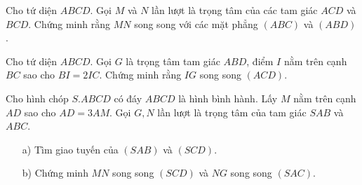 
\begin{vd}
Cho tứ diện $ABCD$. Gọi $M$ và $N$ lần lượt là trọng tâm của các tam giác $ACD$ và $BCD$. Chứng minh rằng $MN$ song song với các mặt phẳng $(ABC)$ và $(ABD)$.
\end{vd}
\begin{vd}
	Cho tứ diện $ABCD$. Gọi $G$ là trọng tâm tam giác $ABD$, điểm $I$ nằm trên cạnh $BC$ sao cho $BI=2IC$. Chứng minh rằng $IG$ song song $\left(ACD\right)$.
\end{vd}
\begin{vd}
	Cho hình chóp $S{.}ABCD$ có đáy $ABCD$ là hình bình hành. Lấy $M$ nằm trên cạnh $AD$ sao cho $AD=3AM$. Gọi $G, N$ lần lượt là trọng tâm của tam giác $SAB$ và $ABC$.
	\begin{itemize}
		\item [a)] Tìm giao tuyến của $\left(SAB\right)$ và $\left(SCD\right)$.
		\item [b)] Chứng minh $MN$ song song $\left(SCD\right)$ và $NG$ song song $\left(SAC\right)$.
	\end{itemize}
\end{vd}
